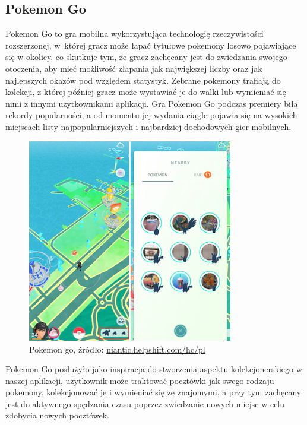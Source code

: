 \documentclass[a4paper,twoside,12pt]{book}
\begin{document}
\subsection{Pokemon Go}
Pokemon Go to gra mobilna wykorzystująca technologię rzeczywistości rozszerzonej, w~której gracz może łapać tytułowe pokemony losowo pojawiające się w okolicy, co skutkuje tym, że gracz zachęcany jest do zwiedzania swojego otoczenia, aby mieć możliwość złapania jak największej liczby oraz jak najlepszych okazów pod względem statystyk. Zebrane pokemony trafiają do kolekcji, z której później gracz może wystawiać je do walki lub wymieniać się nimi z innymi użytkownikami aplikacji. Gra Pokemon Go podczas premiery biła rekordy popularności, a od momentu jej wydania ciągle pojawia się na wysokich miejscach listy najpopularniejszych i najbardziej dochodowych gier mobilnych.
\begin{figure}[H]
    \centering
    \includegraphics[width=0.8\textwidth]{apki_ss/pokemon.png}
    \captionsetup{justification=centering}
    \caption{Pokemon go, źródło: \href{https://niantic.helpshift.com/hc/pl/6-pokemon-go/faq/2345-how-do-i-find-specific-pokemon}{niantic.helpshift.com/hc/pl}}
\end{figure}
Pokemon Go posłużyło jako inspiracja do stworzenia aspektu kolekcjonerskiego w naszej aplikacji, użytkownik może traktować pocztówki jak swego rodzaju pokemony, kolekcjonować je i wymieniać się ze znajomymi, a przy tym zachęcany jest do aktywnego spędzania czasu poprzez zwiedzanie nowych miejsc w celu zdobycia nowych pocztówek.
\end{document}

